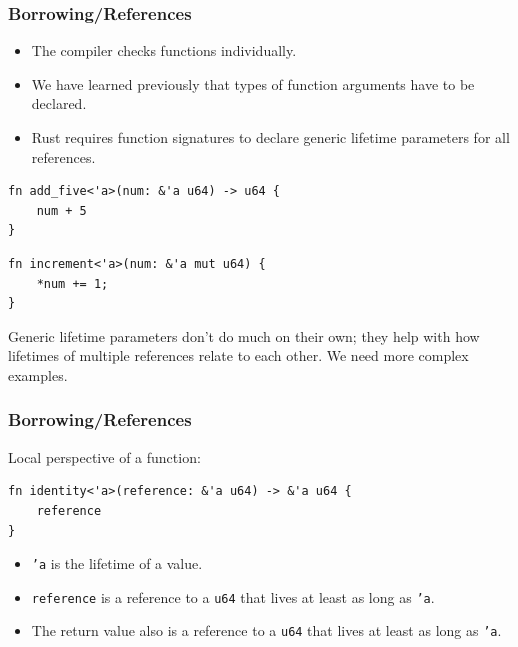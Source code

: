 \begin{frame}[fragile]
    \frametitle{Borrowing/References}
    \begin{itemize}
        \item The compiler checks functions individually.
        \item We have learned previously that types of function arguments have to be declared.
        \pause
        \item Rust requires function signatures to declare generic lifetime parameters for all references.
    \end{itemize}
    \vfill
    \begin{verbatim}
fn add_five<'a>(num: &'a u64) -> u64 {
    num + 5
}
    \end{verbatim}
    \pause
    \begin{verbatim}
fn increment<'a>(num: &'a mut u64) {
    *num += 1;
}
    \end{verbatim}
    \pause
    \space
    Generic lifetime parameters don't do much on their own; they help with how lifetimes of multiple references relate to each other.
    We need more complex examples.
\end{frame}

\begin{frame}[fragile]
    \frametitle{Borrowing/References}
    Local perspective of a function:
    \vfill
    \begin{verbatim}
fn identity<'a>(reference: &'a u64) -> &'a u64 {
    reference
}
    \end{verbatim}
    \pause
    \vfill
    \begin{itemize}
        \item \texttt{'a} is the lifetime of a value.
        \item \texttt{reference} is a reference to a \texttt{u64} that lives at least as long as \texttt{'a}.
        \item The return value also is a reference to a \texttt{u64} that lives at least as long as \texttt{'a}.
    \end{itemize}
\end{frame}

